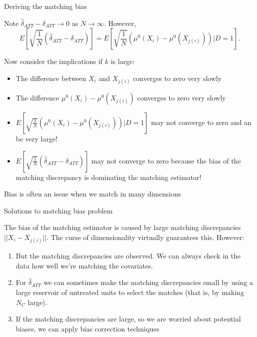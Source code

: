 \documentclass{beamer}
\begin{document}
\begin{frame}{Deriving the matching bias}
	
Note $\widehat{\delta}_{ATT} - \delta_{ATT} \to 0$ as $N \to \infty$.
\pause However, 
$$E[ \sqrt{\frac{1}{N}} (\widehat{\delta}_{ATT} - \delta_{ATT})] = E[ \sqrt{\frac{1}{N}} ( \mu^0(X_i) - \mu^0(X_{j(i)}) ) | D=1].$$ 

Now consider the implications if $k$ is large:
	\begin{itemize}
	\item The difference between $X_i$ and $X_{j(i)}$ converges to zero very slowly
	\item The difference $\mu^0(X_i) - \mu^0(X_{j(i)})$ converges to zero very slowly
	\item $E[ \sqrt{\frac{1}{N}} (\mu^0(X_i) - \mu^0(X_{j(i)})) | D=1]$ may not converge to zero and an be very large!
	\item $E[ \sqrt{\frac{1}{N}} (\widehat{\delta}_{ATT} - \delta_{ATT})]$ may not converge to zero because the bias of the matching discrepancy is dominating the matching estimator!
	\end{itemize}
Bias is often an issue when we match in many dimensions
\end{frame}

\begin{frame}{Solutions to matching bias problem}
	
The bias of the matching estimator is caused by large matching discrepancies $||X_i - X_{j(i)}||$. The curse of dimensionality virtually guarantees this.  However:
	\begin{enumerate}
	\item But the matching discrepancies are observed. We can always check in the data how well we're matching the covariates.

	\item For $\widehat{\delta}_{ATT}$ we can sometimes make the matching discrepancies small by using a large reservoir of untreated units to select the matches (that is, by making $N_C$ large).

  \item If the matching discrepancies are large, so we are worried about potential biases, we can apply bias correction techniques

	\end{enumerate}
\end{frame}
\end{document}
